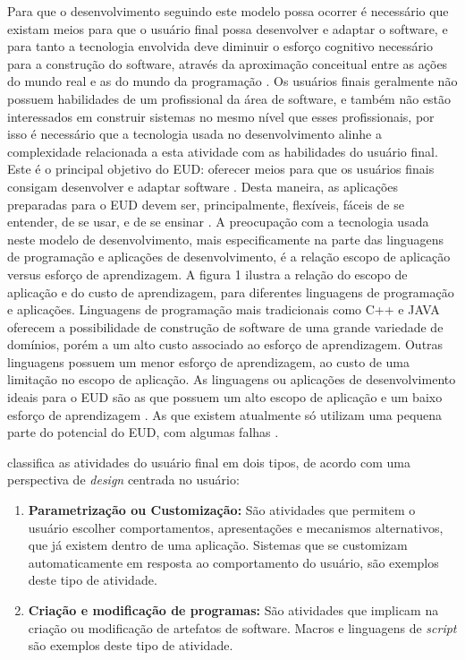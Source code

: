 Para que o desenvolvimento seguindo este modelo possa ocorrer é necessário que existam meios para que o usuário final possa desenvolver e adaptar o software, e para tanto a tecnologia envolvida deve diminuir o esforço cognitivo necessário para a construção do software, através da aproximação conceitual entre as ações do mundo real e as do mundo da programação \cite{fischer2004}. Os usuários finais geralmente não possuem habilidades de um profissional da área de software, e também não estão interessados em construir sistemas no mesmo nível que esses profissionais, por isso é necessário que a tecnologia usada no desenvolvimento alinhe a complexidade relacionada a esta atividade com as habilidades do usuário final. Este é o principal objetivo do EUD: oferecer meios para que os usuários finais consigam desenvolver e adaptar software \cite{lieberman2006}. Desta maneira, as aplicações preparadas para o EUD devem ser, principalmente, flexíveis, fáceis de se entender, de se usar, e de se ensinar \cite{lieberman2006}. A preocupação com a tecnologia usada neste modelo de desenvolvimento, mais especificamente na parte das linguagens de programação e aplicações de desenvolvimento, é a relação escopo de aplicação versus esforço de aprendizagem. A figura 1 ilustra a relação do escopo de aplicação e do custo de aprendizagem, para diferentes linguagens de programação e aplicações. Linguagens de programação mais tradicionais como C++ e JAVA oferecem a possibilidade de construção de software de uma grande variedade de domínios, porém a um alto custo associado ao esforço de aprendizagem. Outras linguagens possuem um menor esforço de aprendizagem, ao custo de uma limitação no escopo de aplicação. As linguagens ou aplicações de desenvolvimento ideais para o EUD são as que possuem um alto escopo de aplicação e um baixo esforço de aprendizagem \cite{fischer2004}. As que existem atualmente só utilizam uma pequena parte do potencial do EUD, com algumas falhas \cite{paterno2013}.

 classifica as atividades do usuário final em dois tipos, de acordo com uma perspectiva de \textit{design} centrada no usuário:

\begin{enumerate}
\item \textbf{Parametrização ou Customização:} São atividades que permitem o usuário escolher comportamentos, apresentações e mecanismos  alternativos, que já existem dentro de uma aplicação. Sistemas que se customizam automaticamente em resposta ao comportamento do usuário, são exemplos deste tipo de atividade.

\item \textbf{Criação e modificação de programas:} São atividades que implicam na criação ou modificação de artefatos de software. Macros e linguagens de \textit{script} são exemplos deste tipo de atividade.
\end{enumerate}


